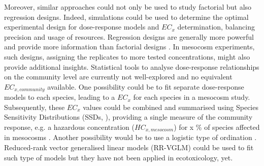 Moreover, similar approaches could not only be used to study factorial but also regression designs.
Indeed, simulations could be used to determine the optimal experimental design for dose-response models and $EC_x$ determination, balancing precision and usage of resources. 
Regression designs are generally more powerful and provide more information than factorial designs  \citep{cottingham_knowing_2005}. 
In mesocosm experiments, such designs, assigning the replicates to more tested concentrations, might also provide additional insights.
Statistical tools to analyse dose-response relationships on the community level are currently not well-explored and no equivalent $EC_{x, community}$ available.
One possibility could be to fit separate dose-response models to each species, leading to a $EC_x$ for each species in a mesocosm study.
Subsequently, these $EC_x$ values could be combined and summarised using Species Sensitivity Distributions (SSDs, \citet{posthuma_species_2002}), providing a single measure of the community response, e.g. a hazardous concentration ($HC_{x, mesocosm}$) for x \% of species affected in mesocosms \citep{maltby_insecticide_2005}. 
Another possibility would be to use a logistic type of ordination \citep{van_den_brink_multivariate_2003}. 
Reduced-rank vector generalised linear models (RR-VGLM) could be used to fit such type of models \citep{yee_reduced-rank_2003, yee_vector_2015} but they have not been applied in ecotoxicology, yet.

